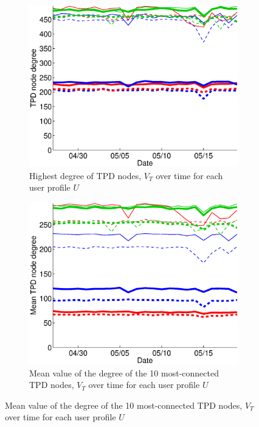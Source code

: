 \documentclass{sig-alternate}
\begin{document}
\begin{figure}
\begin{subfigure}{.38\textwidth}
  \end{subfigure}
  \begin{subfigure}{.38\textwidth}
    \includegraphics[width=\textwidth]{figures/plots/third-mean-top1.eps}
    \caption{Highest degree of TPD nodes, $V_T$ over time for each user profile $U$}
    \label{fig:third_mean_top1_without_entities}
  \end{subfigure}
  \begin{subfigure}{.38\textwidth}
    \includegraphics[width=\textwidth]{figures/plots/third-mean-top10.eps}
    \caption{Mean value of the degree of the 10 most-connected TPD nodes, $V_T$ over time for each user profile $U$}
    \label{fig:third_mean_top10_without_entities}
  \end{subfigure}


\end{figure}
\end{document}
